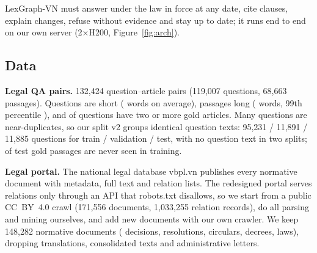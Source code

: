 \documentclass{article} %
\begin{document}
LexGraph-VN must answer under the law in force at any date, cite clauses, explain changes, refuse without
evidence and stay up to date; it runs end to end on our own server (2$\times$H200, Figure~\ref{fig:arch}).

\subsection{Data}
\label{sec:data}
\textbf{Legal QA pairs.} 132,424 question--article pairs (119,007 questions, 68,663 passages). Questions are short
(\EdaQWords{} words on average), passages long (\EdaPWords{} words, 99th percentile \EdaPWordsNinetyNine), and
\EdaMultiGold{} of questions have two or more gold articles. Many questions are near-duplicates, so our split v2 groups
identical question texts: 95,231 / 11,891 / 11,885 questions for train / validation / test, with no question text in two
splits; \EdaUnseen{} of test gold passages are never seen in training.

\textbf{Legal portal.} The national legal database vbpl.vn publishes every normative document with metadata, full text
and relation lists. The redesigned portal serves relations only through an API that robots.txt disallows, so we start
from a public CC~BY~4.0 crawl (171,556 documents, 1,033,255 relation records), do all parsing and mining ourselves, and
add new documents with our own crawler. We keep 148,282 normative documents (\KgTypeDecision{} decisions,
\KgTypeResolution{} resolutions, \KgTypeCircular{} circulars, \KgTypeDecree{} decrees, \KgTypeLaw{} laws), dropping
translations, consolidated texts and administrative letters.

\begin{table}[t]
\centering
\caption{\textbf{Data at a glance.} The QA pairs supervise retrieval; the knowledge graph is mined from the portal.}
\label{tab:data}
\end{table}
\end{document}
